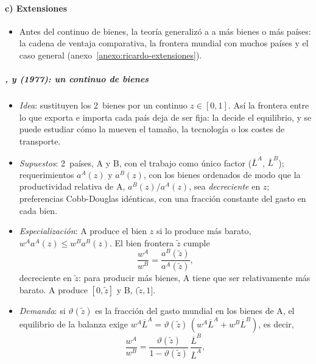 \documentclass[11pt]{article}
\begin{document}
\paragraph{c) Extensiones}

\begin{itemize}
\item Antes del continuo de bienes, la teoría generalizó a  a más bienes o más países: la cadena de ventaja comparativa, la frontera mundial con muchos países y el caso general (anexo~\ref{anexo:ricardo-extensiones}).
\end{itemize}

\subparagraph{,  y  (1977): un continuo de bienes}

\begin{itemize}
\item \emph{Idea}: \textcite{DornbuschFischerSamuelson1977Comparative} sustituyen los 2~bienes por un continuo $z\in[0,1]$. Así la frontera entre lo que exporta e importa cada país deja de ser fija: la decide el equilibrio, y se puede estudiar cómo la mueven el tamaño, la tecnología o los costes de transporte.
\item \emph{Supuestos}: 2~países, A y B, con el trabajo como único factor ($\overline L^A$, $\overline L^B$); requerimientos $a^A(z)$ y $a^B(z)$, con los bienes ordenados de modo que la productividad relativa de A, $a^B(z)/a^A(z)$, sea \emph{decreciente} en $z$; preferencias Cobb-Douglas idénticas, con una fracción constante del gasto en cada bien.
\item \emph{Especialización}: A produce el bien $z$ si lo produce más barato, $w^Aa^A(z)\le w^Ba^B(z)$. El bien frontera $\tilde z$ cumple
  \begin{equation}\label{eq:dfs-oferta}
  \frac{w^A}{w^B}=\frac{a^B(\tilde z)}{a^A(\tilde z)},
  \end{equation}
  decreciente en $\tilde z$: para producir más bienes, A tiene que ser relativamente más barato. A produce $[0,\tilde z]$ y B, $(\tilde z,1]$.
\item \emph{Demanda}: si $\vartheta(\tilde z)$ es la fracción del gasto mundial en los bienes de A, el equilibrio de la balanza exige $w^A\overline L^A=\vartheta(\tilde z)\,(w^A\overline L^A+w^B\overline L^B)$, es decir,
  \begin{equation}\label{eq:dfs-demanda}
  \frac{w^A}{w^B}=\frac{\vartheta(\tilde z)}{1-\vartheta(\tilde z)}\,\frac{\overline L^B}{\overline L^A},
  \end{equation}

\end{itemize}
\end{document}
